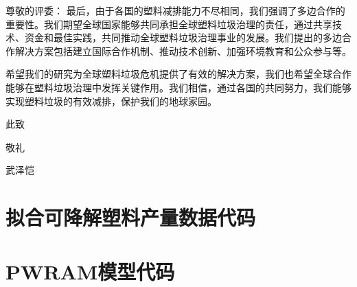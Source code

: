 \documentclass[UTF8, fontset=windows]{mcmthesis}
\begin{document}
\begin{appendices}
\begin{letter}{尊敬的评委：}
最后，由于各国的塑料减排能力不尽相同，我们强调了多边合作的重要性。我们期望全球国家能够共同承担全球塑料垃圾治理的责任，通过共享技术、资金和最佳实践，共同推动全球塑料垃圾治理事业的发展。我们提出的多边合作解决方案包括建立国际合作机制、推动技术创新、加强环境教育和公众参与等。

希望我们的研究为全球塑料垃圾危机提供了有效的解决方案，我们也希望全球合作能够在塑料垃圾治理中发挥关键作用。我们相信，通过各国的共同努力，我们能够实现塑料垃圾的有效减排，保护我们的地球家园。  

\vspace{\parskip}

此致

敬礼

武泽恺

\end{letter}

\newpage

\section{拟合可降解塑料产量数据代码}
\label{sec:fit}



\section{PWRAM模型代码}
\label{sec:pwram}



\end{appendices}

\AImatter
\end{document}

